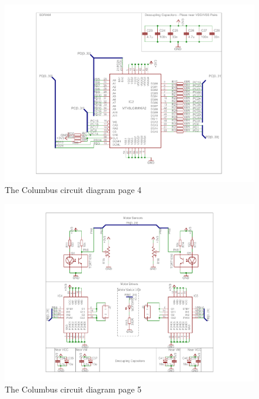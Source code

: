 \begin{figure}[ht!]
\centering
\includegraphics[angle = 90, width=\textwidth,height=\textheight,keepaspectratio]{./Figures/ColumbusCircuitPage4.pdf}
\caption{The Columbus circuit diagram page 4}
\label{sch:Columbus_Schematic:4}
\end{figure}

\begin{figure}[ht!]
\centering
\includegraphics[angle = 90, width=\textwidth,height=\textheight,keepaspectratio]{./Figures/ColumbusCircuitPage5.pdf}
\caption{The Columbus circuit diagram page 5}
\label{sch:Columbus_Schematic:5}
\end{figure}

